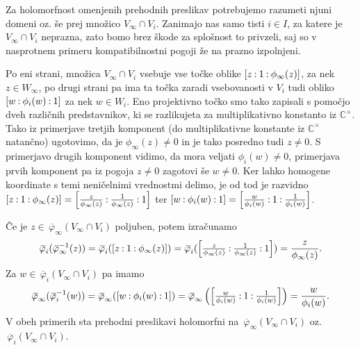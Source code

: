 \documentclass[mat1]{fmfdelo}
\numberwithin{equation}{section}
\newcommand{\CM}{\mathbb C ^\times}
\newcommand{\inv}{^{-1}}
\newcommand{\pcoor}[1]{%
\begingroup\lccode`~=`: \lowercase{\endgroup
\edef~}{\mathbin{\mathchar\the\mathcode`:}\nobreak}%
\left[%
\begingroup
\mathcode`:=\string"8000
#1%
\endgroup
\right]%
}
\newcommand{\olsi}[1]{\,\overline{\!{#1}}} %
\theoremstyle{definition}
\begin{document}
Za holomorfnost omenjenih prehodnih preslikav potrebujemo razumeti njuni domeni oz. še prej množico $V_\infty \cap V_i$. Zanimajo nas samo tisti $i \in I$, za katere je $V_\infty \cap V_i$ neprazna, zato bomo brez škode za splošnost to privzeli, saj so v nasprotnem primeru kompatibilnostni pogoji že na prazno izpolnjeni. 

Po eni strani, množica $V_\infty \cap V_i$ vsebuje vse točke oblike $\pcoor{z : 1 : \phi_\infty(z)}$, za nek $z \in W_\infty$, po drugi strani pa ima ta točka zaradi vsebovanosti v $V_i$ tudi obliko $\pcoor{w : \phi_i(w) : 1}$ za nek $w \in W_i$. Eno projektivno točko smo tako zapisali s pomočjo dveh različnih predstavnikov, ki se razlikujeta za multiplikativno konstanto iz $\CM$. Tako iz primerjave tretjih komponent (do multiplikativne konstante iz $\CM$ natančno) ugotovimo, da je $\phi_\infty(z) \neq 0$ in je tako posredno tudi $z \neq 0$. S primerjavo drugih komponent vidimo, da mora veljati $\phi_i(w) \neq 0$, primerjava prvih komponent pa iz pogoja $z \neq 0$ zagotovi še $w \neq 0$. Ker lahko homogene koordinate s temi neničelnimi vrednostmi delimo, je od tod je razvidno $\pcoor{z : 1 : \phi_\infty(z)} = \pcoor{\tfrac{z}{\phi_\infty(z)} : \tfrac{1}{\phi_\infty(z)} : 1}$ ter $\pcoor{w : \phi_i(w) : 1} = \pcoor{\tfrac{w}{\phi_i(w)} : 1 : \tfrac{1}{\phi_i(w)}}$. 

Če je $z \in \olsi{\varphi}_\infty(V_\infty \cap V_i)$ poljuben, potem izračunamo 
\[
    \olsi{\varphi}_i (\olsi{\varphi}_\infty\inv (z)) = 
    \olsi{\varphi}_i (\pcoor{z : 1 : \phi_\infty(z)}) = 
    \olsi{\varphi}_i (\pcoor{\tfrac{z}{\phi_\infty(z)} : \tfrac{1}{\phi_\infty(z)} : 1}) = 
    \frac{z}{\phi_\infty(z)}.
\]
Za $w \in \olsi{\varphi}_i(V_\infty \cap V_i)$ pa imamo
\[
    \olsi{\varphi}_\infty (\olsi{\varphi}_i\inv(w)) =
    \olsi{\varphi}_\infty (\pcoor{w : \phi_i(w) : 1}) =
    \olsi{\varphi}_\infty \left(\pcoor{\tfrac{w}{\phi_i(w)} : 1 : \tfrac{1}{\phi_i(w)}}\right) =
    \frac{w}{\phi_i(w)}.
\]
V obeh primerih sta prehodni preslikavi holomorfni na $\olsi{\varphi}_\infty(V_\infty \cap V_i)$ oz. $\olsi{\varphi}_i(V_\infty \cap V_i)$.
\end{document}
